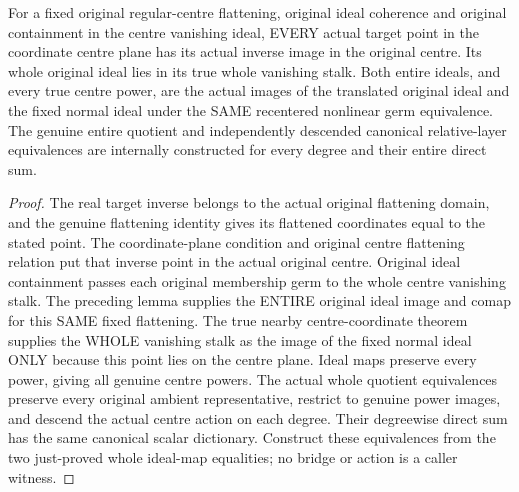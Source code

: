 \begin{lemma}
\label{hir:real-domain-fixed-flattening-original-centre-ideal-bridge}
\leanok
For a fixed original regular-centre flattening, original ideal coherence and
original containment in the centre vanishing ideal, EVERY actual target
point in the coordinate centre plane has its actual inverse image in the
original centre. Its whole original ideal lies in its true whole vanishing
stalk. Both entire ideals, and every true centre power, are the actual images
of the translated original ideal and the fixed normal ideal under the SAME
recentered nonlinear germ equivalence. The genuine entire quotient and
independently descended canonical relative-layer equivalences are internally
constructed for every degree and their entire direct sum.
\end{lemma}
\begin{proof}
The real target inverse belongs to the actual original flattening domain,
and the genuine flattening identity gives its flattened coordinates equal
to the stated point. The coordinate-plane condition and original centre
flattening relation put that inverse point in the actual original centre.
Original ideal containment passes each original membership germ to the
whole centre vanishing stalk. The preceding lemma supplies the ENTIRE
original ideal image and comap for this SAME fixed flattening. The true
nearby centre-coordinate theorem supplies the WHOLE vanishing stalk as the
image of the fixed normal ideal ONLY because this point lies on the centre
plane. Ideal maps preserve every power, giving all genuine centre powers.
The actual whole quotient equivalences preserve every original ambient
representative, restrict to genuine power images, and descend the actual
centre action on each degree. Their degreewise direct sum has the same
canonical scalar dictionary. Construct these equivalences from the two
just-proved whole ideal-map equalities; no bridge or action is a caller
witness.
\end{proof}

